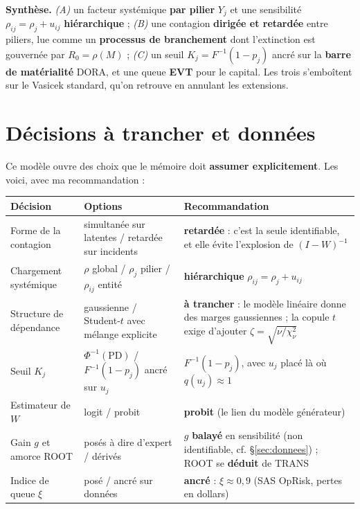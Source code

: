 \documentclass[11pt,a4paper]{article}
\newcommand{\Y}{Y}
\begin{document}
\begin{cle}
\textbf{Synthèse.} \emph{(A)} un facteur systémique \textbf{par pilier} $\Y_j$ et une
sensibilité $\rho_{ij}=\rho_j+u_{ij}$ \textbf{hiérarchique} ; \emph{(B)} une contagion
\textbf{dirigée et retardée} entre piliers, lue comme un \textbf{processus de branchement}
dont l'extinction est gouvernée par $R_0 = \rho(M)$ ; \emph{(C)} un seuil
$K_j = F^{-1}(1-p_j)$ ancré sur la \textbf{barre de matérialité} DORA, et une queue
\textbf{EVT} pour le capital. Les trois s'emboîtent sur le Vasicek standard, qu'on retrouve
en annulant les extensions.
\end{cle}

\clearpage
\section{Décisions à trancher et données}

Ce modèle ouvre des choix que le mémoire doit \textbf{assumer explicitement}. Les voici, avec
ma recommandation :

\begin{table}[htbp]\centering\small
\renewcommand{\arraystretch}{1.35}
\begin{tabular}{@{}>{\raggedright\arraybackslash}p{3.2cm} >{\raggedright\arraybackslash}p{6.0cm} >{\raggedright\arraybackslash}p{4.9cm}@{}}
\toprule
\textbf{Décision} & \textbf{Options} & \textbf{Recommandation} \\
\midrule
Forme de la contagion & simultanée sur latentes / retardée sur incidents & \textbf{retardée} : c'est la seule identifiable, et elle évite l'explosion de $(I-W)^{-1}$ \\
\addlinespace[2pt]
Chargement systémique & $\rho$ global / $\rho_j$ pilier / $\rho_{ij}$ entité & \textbf{hiérarchique} $\rho_{ij}=\rho_j+u_{ij}$ \\
\addlinespace[2pt]
Structure de dépendance & gaussienne / Student-$t$ avec mélange explicite & \textbf{à trancher} : le modèle linéaire donne des marges gaussiennes ; la copule $t$ exige d'ajouter $\zeta=\sqrt{\nu/\chi^2_\nu}$ \\
\addlinespace[2pt]
Seuil $K_j$ & $\Phi^{-1}(\mathrm{PD})$ / $F^{-1}(1-p_j)$ ancré sur $u_j$ & \textbf{$F^{-1}(1-p_j)$}, avec $u_j$ placé là où $q(u_j)\approx 1$ \\
\addlinespace[2pt]
Estimateur de $W$ & logit / probit & \textbf{probit} (le lien du modèle générateur) \\
\addlinespace[2pt]
Gain $g$ et amorce ROOT & posés à dire d'expert / dérivés & $g$ \textbf{balayé} en sensibilité (non identifiable, cf. \S\ref{sec:donnees}) ; ROOT se \textbf{déduit} de TRANS \\
\addlinespace[2pt]
Indice de queue $\xi$ & posé / ancré sur données & \textbf{ancré} : $\hat\xi\approx 0{,}9$ (SAS OpRisk, pertes en dollars) \\
\bottomrule
\end{tabular}
\end{table}
\end{document}
